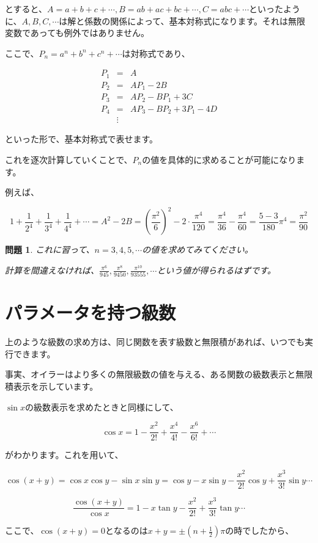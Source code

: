 \documentclass[./main]{subfiles}
\theoremstyle{break}
\newtheorem*{prb}{問題}
\begin{document}
とすると、$A=a+b+c+\cdots,B=ab+ac+bc+\cdots,C=abc+\cdots$といったように、$A,B,C,\cdots$は解と係数の関係によって、基本対称式になります。それは無限変数であっても例外ではありません。

ここで、$P_n=a^n+b^n+c^n+\cdots$は対称式であり、

\begin{eqnarray*}
P_1&=&A\\
P_2&=&AP_1-2B\\
P_3&=&AP_2-BP_1+3C\\
P_4&=&AP_3-BP_2+3P_1-4D\\
&\vdots&
\end{eqnarray*}

といった形で、基本対称式で表せます。

これを逐次計算していくことで、$P_n$の値を具体的に求めることが可能になります。

例えば、

\[1+\frac{1}{2^4}+\frac{1}{3^4}+\frac{1}{4^4}+\cdots=A^2-2B=\left( \frac{\pi^2}{6} \right)^2-2\cdot\frac{\pi^4}{120}=\frac{\pi^4}{36}-\frac{\pi^4}{60}=\frac{5-3}{180}\pi^4=\frac{\pi^2}{90}\]

\begin{prb}
これに習って、$n=3,4,5,\cdots$の値を求めてみてください。

計算を間違えなければ、$\displaystyle \frac{\pi^6}{945},\frac{\pi^8}{9450},\frac{\pi^{10}}{93555},\cdots$という値が得られるはずです。

\end{prb}
\section{パラメータを持つ級数}
上のような級数の求め方は、同じ関数を表す級数と無限積があれば、いつでも実行できます。

事実、オイラーはより多くの無限級数の値を与える、ある関数の級数表示と無限積表示を示しています。

$\sin x$の級数表示を求めたときと同様にして、

\[\cos x=1-\frac{x^2}{2!}+\frac{x^4}{4!}-\frac{x^6}{6!}+\cdots\]

がわかります。これを用いて、

\[\cos(x+y)=\cos x\cos y-\sin x \sin y=\cos y -x\sin y -\frac{x^2}{2!}\cos y+\frac{x^3}{3!}\sin y\cdots\]

\[\frac{\cos (x+y)}{\cos x}=1 -x\tan y- \frac{x^2}{2!}+\frac{x^3}{3!}\tan y\cdots\]

ここで、$\cos (x+y)=0$となるのは$x+y=\pm \left(n+\frac{1}{2}\right)\pi$の時でしたから、
\end{document}
